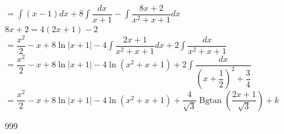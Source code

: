 \documentclass[a4paper]{article}
\begin{document}
$ =  \displaystyle\int\left(x-1\right)dx + 8\displaystyle\int\dfrac{dx}{x+1} -\displaystyle\int\dfrac{8x+2}{x^2+x+1}dx$\\

$8x+2 = 4\left(2x+1\right)-2$\\


$ =  \dfrac{x^2}{2}-x+8\ln{\left|x+1\right|} - 4\displaystyle\int\dfrac{2x+1}{x^2+x+1}dx + 2\displaystyle\int \dfrac{dx}{x^2+x+1}$\\

$ =  \dfrac{x^2}{2}-x+8\ln{\left|x+1\right|} - 4\ln{\left(x^2+x+1\right)} + 2\displaystyle\int \dfrac{dx}{\left(x+\dfrac{1}{2}\right)^2+\dfrac{3}{4}}$\\

$ =  \dfrac{x^2}{2}-x+8\ln{\left|x+1\right|} - 4\ln{\left(x^2+x+1\right)} + \dfrac{4}{\sqrt{3}}\operatorname{Bgtan}\left(\dfrac{2x+1}{\sqrt{3}}\right)+k$\\

\begin{thebibliography}{999}
\end{thebibliography}
\end{document}
